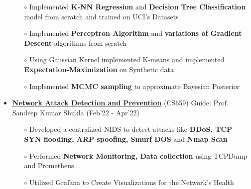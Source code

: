 \documentclass[10.8pt, a4paper]{extarticle}
\begin{document}
\begin{itemize}
\begin{itemize}
	      \item [$\circ$]Implemented \textbf{K-NN Regression} and \textbf{Decision Tree Classification} model  from scratch and trained on UCI's Datasets\\[-0.6cm]
	      \item [$\circ$] Implemented \textbf {Perceptron Algorithm} and \textbf {variations of Gradient Descent} algorithms from scratch\\[-0.6cm]
	      \item [$\circ$]Using Gaussian Kernel implemented K-means and implemented \textbf {Expectation-Maximization} on Synthetic data\\[-0.6cm]
	      
         
         
         \item [$\circ$] Implemented \textbf {MCMC sampling} to approximate Bayesian Posterior\\[-0.6cm]
	\end{itemize}

\item \href{https://github.com/jeetsarangi/Network-Attack-Detection-and-Prevention-using-TCPdump-Grafana-and-Prometheus}{\textbf{Network Attack Detection and Prevention}} (CS659) Guide: Prof. Sandeep Kumar Shukla \hfill(Feb'22 - Apr'22)
	\\[-0.6cm]
	\begin{itemize}
	    \item[$\circ$] Developed a centralized NIDS to detect attacks like \textbf{DDoS, TCP SYN flooding, ARP spoofing, Smurf DOS} and \textbf{Nmap Scan}\\[-0.6cm]
	    \item[$\circ$] Performed \textbf{Network Monitoring, Data collection} using TCPDump and Prometheus\\[-0.6cm]
	    \item[$\circ$] Utilized Grafana to Create Visualizations for the Network's Health\\[-0.6cm]
	\end{itemize}


\end{itemize}
\end{document}
